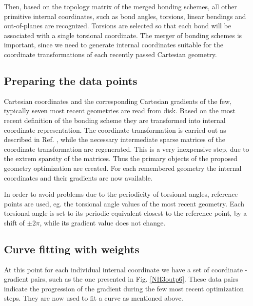 \documentclass[prl,twocolumn,showpacs,twocolumngrid,superbib]{revtex4}
\begin{document}
Then, based on the topology matrix of the merged bonding schemes,
all other primitive internal coordinates, such as bond angles,
torsions, linear bendings and out-of-planes are recognized. Torsions
are selected so that each bond will be associated with a single
torsional coordinate.
The merger of bonding schemes is important, since we need to
generate internal coordinates suitable for the coordinate
transformations of each recently passed Cartesian geometry.

\subsection{Preparing the data points}
Cartesian coordinates and the corresponding Cartesian gradients
of the few, typically seven most recent geometries are read from 
disk. Based on the most recent definition of the bonding scheme
they are transformed into internal coordinate representation.
The coordinate transformation is carried out as described in Ref.
\cite{nemeth_coordtrf1}, while the necessary intermediate sparse
matrices of the coordinate transformation are regenerated. This
is a very inexpensive step, due to the extrem sparsity
of the matrices.
Thus the primary objects of the proposed geometry optimization
are created. For each remembered geometry the internal coordinates
and their gradients are now available.

In order to avoid problems due to the periodicity of torsional angles,
reference points are used, eg. the torsional angle values 
of the most recent geometry. Each torsional angle is
set to its periodic equivalent 
closest to the reference point, by a 
shift of $\pm 2\pi$, while its gradient value does not change.

\subsection{Curve fitting with weights}
At this point for each individual internal coordinate we have a set of 
coordinate - gradient pairs, such as the one presented in 
Fig. \ref{NH3outp6}. These data pairs indicate the progression
of the gradient during the few most recent optimization steps.
They are now used to fit a curve as mentioned above.
\end{document}
